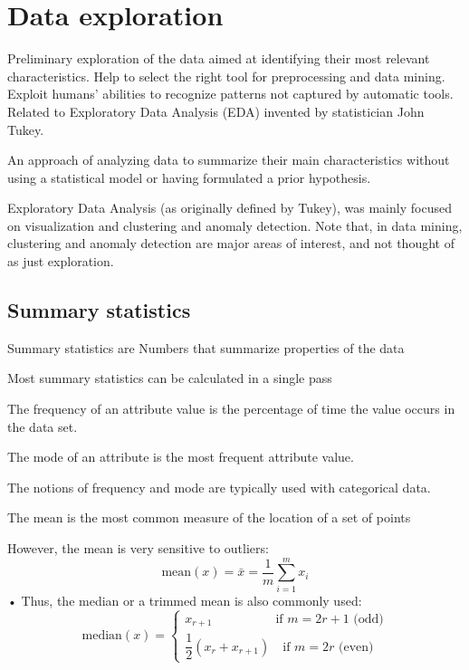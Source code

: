 \section{Data exploration}

Preliminary exploration of the data aimed at identifying their most relevant characteristics.
Help to select the right tool for preprocessing and data mining.
Exploit humans' abilities to recognize patterns not captured by automatic tools.
Related to Exploratory Data Analysis (EDA) invented by statistician John Tukey.
\begin{definition}
    An approach of analyzing data to summarize their main characteristics without using a statistical model or having formulated a prior hypothesis. 
\end{definition}
\noindent Exploratory Data Analysis (as originally defined by Tukey), was mainly focused on visualization and clustering and anomaly detection.
Note that, in data mining, clustering and anomaly detection are major areas of interest, and not thought of as just exploration.

\subsection{Summary statistics}
\begin{definition}
    Summary statistics are Numbers that summarize properties of the data
\end{definition}
\noindent Most summary statistics can be calculated in a single pass

\begin{definition}
    The frequency of an attribute value is the percentage of time the value occurs in the data set. 
\end{definition}
\begin{definition}
    The mode of an attribute is the most frequent attribute value. 
\end{definition}
\noindent The notions of frequency and mode are typically used with categorical data. 

\begin{definition}
    The mean is the most common measure of the location of a set of points
\end{definition}
\noindent However, the mean is very sensitive to outliers: 
\[\text{mean}(x)=\bar{x}=\dfrac{1}{m}\sum_{i=1}^mx_i\]
• Thus, the median or a trimmed mean is also commonly used: 
\[\text{median}(x)=\begin{cases} x_{r+1} \qquad\qquad\quad \text{if } m=2r+1 \text{ (odd)} \\ \dfrac{1}{2}(x_{r}+x_{r+1})\quad \text{if } m=2r \text{ (even)} \end{cases}\]

